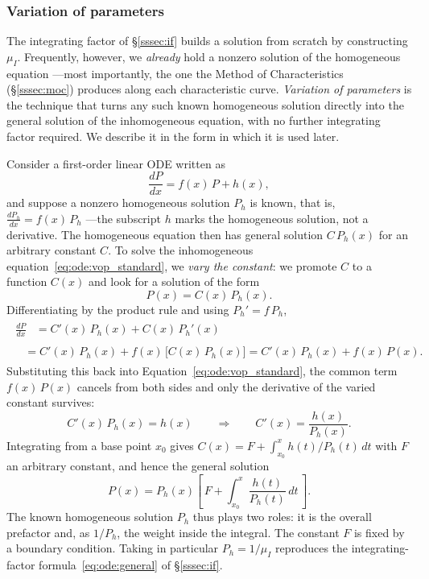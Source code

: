 \subsubsection{Variation of parameters}\label{sssec:vop}

The integrating factor of \S\ref{sssec:if} builds a solution from scratch by constructing $\mu_I$. Frequently, however, we \emph{already} hold a nonzero solution of the homogeneous equation ---most importantly, the one the Method of Characteristics (\S\ref{sssec:moc}) produces along each characteristic curve. \emph{Variation of parameters} is the technique that turns any such known homogeneous solution directly into the general solution of the inhomogeneous equation, with no further integrating factor required. We describe it in the form in which it is used later.

Consider a first-order linear ODE written as
\begin{equation}
    \frac{dP}{dx} = f(x)\,P + h(x),
    \label{eq:ode:vop_standard}
\end{equation}
and suppose a nonzero homogeneous solution $P_h$ is known, that is, $\frac{dP_h}{dx} = f(x)\,P_h$ ---the subscript $h$ marks the homogeneous solution, not a derivative. The homogeneous equation then has general solution $C\,P_h(x)$ for an arbitrary constant $C$. To solve the inhomogeneous equation~\eqref{eq:ode:vop_standard}, we \emph{vary the constant}: we promote $C$ to a function $C(x)$ and look for a solution of the form
\begin{equation*}
    P(x) = C(x)\,P_h(x).
\end{equation*}
Differentiating by the product rule and using $P_h' = f\,P_h$,
\begin{align*}
    \begin{split}
        \frac{dP}{dx} &= C'(x)\,P_h(x) + C(x)\,P_h'(x)
    \end{split}\\
    \begin{split}
        &= C'(x)\,P_h(x) + f(x)\,\bigl[C(x)\,P_h(x)\bigr]
         = C'(x)\,P_h(x) + f(x)\,P(x).
    \end{split}
\end{align*}
Substituting this back into Equation~\eqref{eq:ode:vop_standard}, the common term $f(x)\,P(x)$ cancels from both sides and only the derivative of the varied constant survives:
\begin{equation*}
    C'(x)\,P_h(x) = h(x)
    \qquad\Longrightarrow\qquad
    C'(x) = \frac{h(x)}{P_h(x)}.
\end{equation*}
Integrating from a base point $x_0$ gives $C(x) = F + \int_{x_0}^{x} h(t)/P_h(t)\,dt$ with $F$ an arbitrary constant, and hence the general solution
\begin{equation}
    P(x) = P_h(x)\left[\,F + \int_{x_0}^{x} \frac{h(t)}{P_h(t)}\,dt\,\right].
    \label{eq:ode:vop_general}
\end{equation}
The known homogeneous solution $P_h$ thus plays two roles: it is the overall prefactor and, as $1/P_h$, the weight inside the integral. The constant $F$ is fixed by a boundary condition. Taking in particular $P_h = 1/\mu_I$ reproduces the integrating-factor formula~\eqref{eq:ode:general} of \S\ref{sssec:if}.

